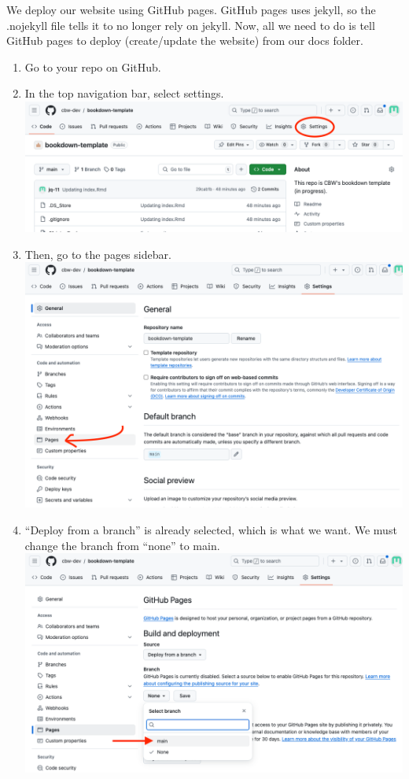 \documentclass[
]{book}
\theoremstyle{definition}
\theoremstyle{definition}
\theoremstyle{definition}
\theoremstyle{definition}
\theoremstyle{remark}
\begin{document}
We deploy our website using GitHub pages. GitHub pages uses jekyll, so the .nojekyll file tells it to no longer rely on jekyll. Now, all we need to do is tell GitHub pages to deploy (create/update the website) from our docs folder.

\begin{enumerate}
\def\labelenumi{\arabic{enumi}.}
\item
  Go to your repo on GitHub.
\item
  In the top navigation bar, select settings.
  \includegraphics{img/git-instruct/github-settings.png}
\item
  Then, go to the pages sidebar.
  \includegraphics{img/git-instruct/github-select-pages.png}
\item
  ``Deploy from a branch'' is already selected, which is what we want. We must change the branch from ``none'' to main.
  \includegraphics{img/git-instruct/github-deploy-main.png}

\end{enumerate}
\end{document}
